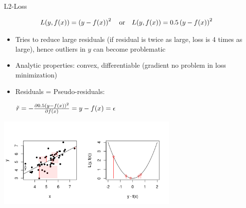 \begin{vbframe}{L2-Loss}

\vspace*{-0.5cm}

$$
L(y, f(x)) = \left(y-f(x)\right)^2 \quad \text{or} \quad L(y, f(x)) = 0.5 \left(y-f(x)\right)^2
$$

\vspace*{-2mm}

\begin{itemize}
\item Tries to reduce large residuals (if residual is twice as large, loss is 4 times as large), hence outliers in $y$ can become problematic
\item Analytic properties: convex, differentiable (gradient no problem in loss minimization)
\item Residuals = Pseudo-residuals: \begin{footnotesize} $\tilde r = - \frac{\partial{0.5 (y-f(x))^2}}{\partial f(x)} = y - f(x) = \epsilon$\end{footnotesize}
\end{itemize}




\vspace*{-6mm}

\begin{center}
  \includegraphics[width = 9cm]{figure_man/loss_quadratic_plot1.png} \\
\end{center}

\end{vbframe}


